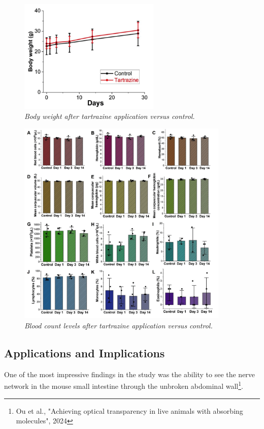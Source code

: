 \documentclass[12pt]{article}
\begin{document}
\begin{figure}[H]
  \centering
  \includegraphics[width=0.6\textwidth]{figures/body weight.png}
  \caption{\emph{Body weight after tartrazine application versus control.}}
  \label{fig:weight}
\end{figure}


\begin{figure}[H]
  \centering
  \includegraphics[width=0.9\textwidth]{figures/blood count.png}
  \caption{\emph{Blood count levels after tartrazine application versus control.}}
  \label{fig:blood}
\end{figure}





\subsection{Applications and Implications}
One of the most impressive findings in the study was the ability to see the nerve network in the mouse small intestine through the unbroken abdominal wall\footnote{Ou et al., "Achieving optical transparency in live animals with absorbing molecules", 2024}. 
\end{document}
